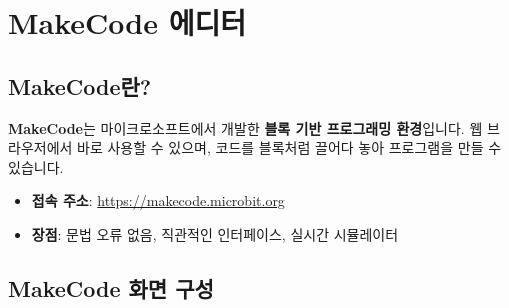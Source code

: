 \documentclass[11pt, a4paper]{article}
\begin{document}
\section{MakeCode 에디터}

\subsection{MakeCode란?}

\textbf{MakeCode}는 마이크로소프트에서 개발한 \textbf{블록 기반 프로그래밍 환경}입니다. 웹 브라우저에서 바로 사용할 수 있으며, 코드를 블록처럼 끌어다 놓아 프로그램을 만들 수 있습니다.

\begin{itemize}
    \item \textbf{접속 주소}: \url{https://makecode.microbit.org}
    \item \textbf{장점}: 문법 오류 없음, 직관적인 인터페이스, 실시간 시뮬레이터
\end{itemize}

\subsection{MakeCode 화면 구성}
\end{document}
